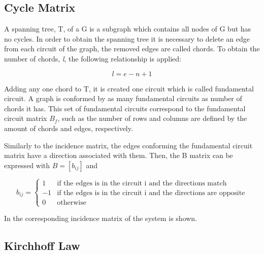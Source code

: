 
\subsection{Cycle Matrix}
\label{CycleSection}
A spanning tree, T, of a G is a subgraph which contains all nodes of G but has no cycles. 
In order to obtain the spanning tree it is necessary to delete an edge from each 
circuit of the graph, the removed edges are called chords. To obtain the number 
of chords, \textit{l}, the following relationship is applied:

\begin{equation}
  \label{Numberofchords}
  l = e - n +1
\end{equation}

Adding any one chord to T, it is created one circuit which is called fundamental 
circuit. A graph is conformed by as many fundamental circuits as number of chords it has.  
This set of fundamental circuits correspond to the fundamental circuit matrix 
$B_f$, such as the number of rows and columns are defined by the amount of chords and edges, respectively. 

Similarly to the incidence matrix, the edges conforming the fundamental circuit 
matrix have a direction associated with them. Then, the B matrix can be 
expressed with $B = [b_{ij}]$ and

\begin{equation}
\label{DiGraphCycle}
 b_{ij} =
		\left\{
		\begin{array}{ll}
		
		1 			&      \text{if the edges is in the circuit i and the directions match}	
\\
		-1                       &     \text{if the edges is in the circuit i and the directions are opposite}
\\

                0                       &      \text{otherwise}

		\end{array}
		\right.
\end{equation}	

In  the corresponding incidence matrix of the system is 
shown.

\subsection{Kirchhoff Law}
\label{KirchhoffSection}


